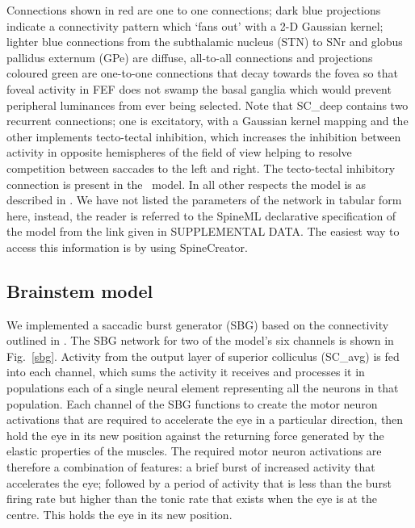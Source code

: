\documentclass{frontiersSCNS}
\begin{document}
Connections shown in red are one to one connections; dark blue
projections indicate a connectivity pattern which `fans out' with a
2-D Gaussian kernel; lighter blue connections from the subthalamic
nucleus (STN) to SNr and globus pallidus externum (GPe) are diffuse,
all-to-all connections and projections coloured green are one-to-one
connections that decay towards the fovea so that foveal activity in
FEF does not swamp the basal ganglia which would prevent peripheral
luminances from ever being selected.
%
Note that SC\_deep contains two recurrent connections; one is
excitatory, with a Gaussian kernel mapping and the other implements
tecto-tectal inhibition, which increases the inhibition between
activity in opposite hemispheres of the field of
view \citep{gian_g._mascetti_tectotectal_1981,olivier_evidence_2000}
helping to resolve competition between saccades to the left and
right. The tecto-tectal inhibitory connection is  present in
the \ccg~model. In all other respects the model is as described in
\cite{cope_basal_2017}.
%
We have not listed the parameters of the network in tabular form here,
instead, the reader is referred to the SpineML declarative
specification of the model from the link given in SUPPLEMENTAL DATA.
The easiest way to access this information is by using SpineCreator.


\subsection{Brainstem model} \label{sec:methods:brainstem}

We implemented a saccadic burst generator (SBG) based on the
connectivity outlined in \cite{gancarz_neural_1998}. The SBG network
for two of the model's six channels is shown in
Fig.~\ref{sbg}.  Activity from the output layer of superior
colliculus
%
(SC\_avg) is fed into each channel, which sums the activity it
receives and processes it in populations each of a single neural
element representing all the neurons in that population. Each channel
of the SBG functions to create the motor neuron activations that are
required to accelerate the eye in a particular direction, then hold
the eye in its new position against the returning force generated by
the elastic properties of the muscles.  The required motor neuron
activations are therefore a combination of features: a brief burst of
increased activity that accelerates the eye; followed by a period of
activity that is less than the burst firing rate but higher than the
tonic rate that exists when the eye is at the centre. This holds the
eye in its new position.
\end{document}
